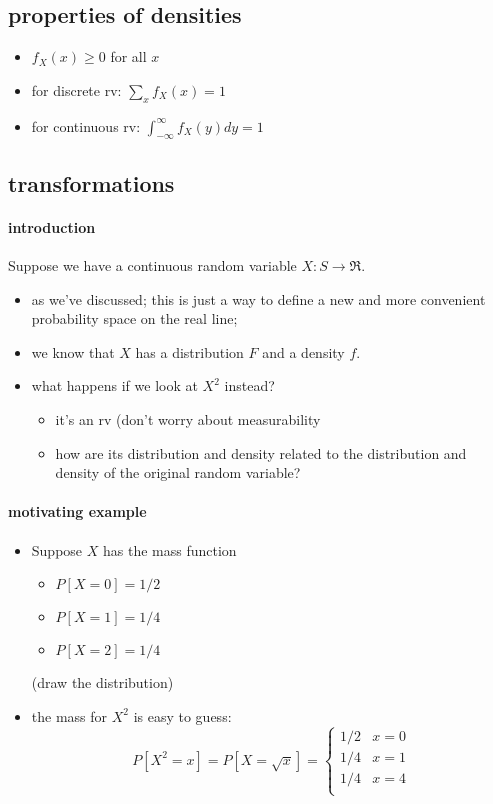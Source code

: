 \subsection{properties of densities}

\begin{itemize}
\item $f_X(x) \geq 0$ for all $x$
\item for discrete rv: $\sum_x f_X(x) = 1$
\item for continuous rv: $\int_{-\infty}^{\infty} f_X(y) dy = 1$
\end{itemize}

\subsection{transformations}

\paragraph{introduction}

      Suppose we have a continuous random variable $X: S \to \Re$.

\begin{itemize}
\item as we've discussed; this is just a way to define a new and more
        convenient probability space on the real line;
\item we know that $X$ has a distribution $F$ and a density $f$.
\item what happens if we look at $X^2$ instead?
\begin{itemize}
\item it's an rv (don't worry about measurability
\item how are its distribution and density related to the distribution
          and density of the original random variable?
\end{itemize}
\end{itemize}

\paragraph{motivating example}

\begin{itemize}
\item Suppose $X$ has the mass function
\begin{itemize}
\item $P[X = 0] = 1/2$
\item $P[X = 1] = 1/4$
\item $P[X = 2] = 1/4$
\end{itemize}
(draw the distribution)
\item the mass for $X^2$ is easy to guess:
        \[P[X^2 = x] = P[X = \sqrt{x}] = \begin{cases}
          1/2 & x = 0 \\
          1/4 & x = 1 \\
          1/4 & x = 4 \\
        \end{cases}\]
\end{itemize}

